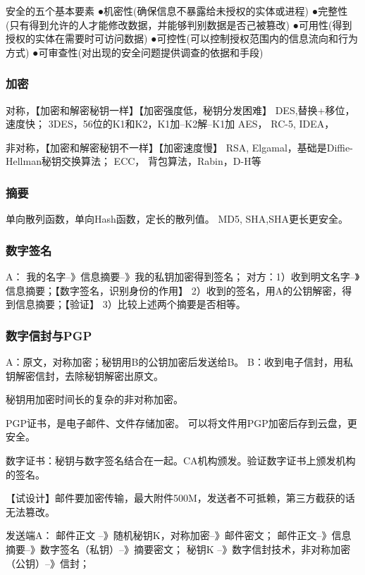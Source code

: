 \documentclass[UTF8]{article}
\begin{document}
安全的五个基本要素
●机密性(确保信息不暴露给未授权的实体或进程)
●完整性(只有得到允许的人才能修改数据，并能够判别数据是否己被篡改)
●可用性(得到授权的实体在需要时可访问数据)
●可控性(可以控制授权范围内的信息流向和行为方式)
●可审查性(对出现的安全问题提供调查的依据和手段)


\subsubsection{加密}
对称，【加密和解密秘钥一样】【加密强度低，秘钥分发困难】
DES,替换+移位，速度快；
3DES，56位的K1和K2，K1加--K2解--K1加 
AES，
RC-5,
IDEA，


非对称，【加密和解密秘钥不一样】【加密速度慢】
RSA,
Elgamal，基础是Diffie-Hellman秘钥交换算法；
ECC，
背包算法，Rabin，D-H等


\subsubsection{摘要}

单向散列函数，单向Hash函数，定长的散列值。
MD5, SHA,SHA更长更安全。


\subsubsection{数字签名}
A： 我的名字--》信息摘要--》我的私钥加密得到签名；
对方：1）收到明文名字--》信息摘要；【数字签名，识别身份的作用】
      2）收到的签名，用A的公钥解密，得到信息摘要；【验证】
      3）比较上述两个摘要是否相等。



\subsubsection{数字信封与PGP}
A：原文，对称加密；秘钥用B的公钥加密后发送给B。
B：收到电子信封，用私钥解密信封，去除秘钥解密出原文。

秘钥用加密时间长的复杂的非对称加密。

PGP证书，是电子邮件、文件存储加密。
可以将文件用PGP加密后存到云盘，更安全。

数字证书：秘钥与数字签名结合在一起。CA机构颁发。验证数字证书上颁发机构的签名。


【试设计】邮件要加密传输，最大附件500M，发送者不可抵赖，第三方截获的话无法篡改。

发送端A：
邮件正文 --》随机秘钥K，对称加密--》邮件密文；
邮件正文--》信息摘要--》数字签名（私钥）--》摘要密文；
秘钥K --》数字信封技术，非对称加密（公钥）--》信封；
\end{document}
